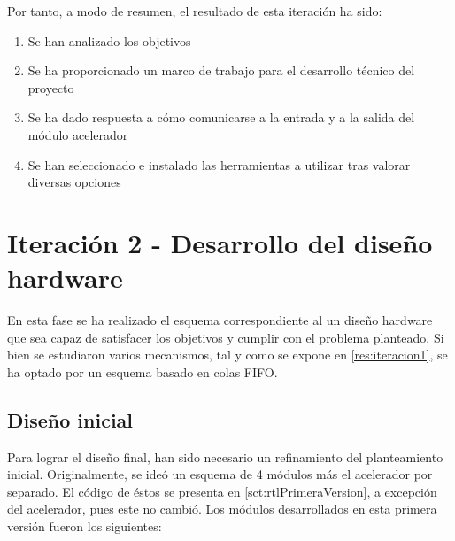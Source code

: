 Por tanto, a modo de resumen, el resultado de esta iteración ha sido:

\begin{enumerate}[noitemsep]
    \item Se han analizado los objetivos
    \item Se ha proporcionado un marco de trabajo para el desarrollo técnico del proyecto
    \item Se ha dado respuesta a cómo comunicarse a la entrada y a la salida del módulo acelerador
    \item Se han seleccionado e instalado las herramientas a utilizar tras valorar diversas opciones
\end{enumerate}

\section{Iteración 2 - Desarrollo del diseño hardware}

En esta fase se ha realizado el esquema correspondiente al un diseño hardware que sea capaz de satisfacer los objetivos y cumplir con el problema planteado. Si bien se estudiaron varios mecanismos, tal y como se expone en \ref{res:iteracion1}, se ha optado por un esquema basado en colas FIFO. 

\subsection{Diseño inicial}

Para lograr el diseño final, han sido necesario un refinamiento del planteamiento inicial. Originalmente, se ideó un esquema de 4 módulos más el acelerador por separado. El código de éstos se presenta en \ref{sct:rtlPrimeraVersion}, a excepción del acelerador, pues este no cambió. Los módulos desarrollados en esta primera versión fueron los siguientes:

